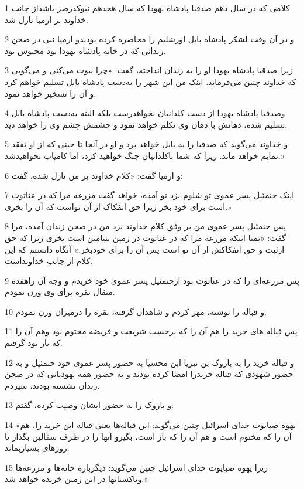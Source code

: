 \par 1 کلامی که در سال دهم صدقیا پادشاه یهودا که سال هجدهم نبوکدرصر باشداز جانب خداوند بر ارمیا نازل شد.
\par 2 و در آن وقت لشکر پادشاه بابل اورشلیم را محاصره کرده بودندو ارمیا نبی در صحن زندانی که در خانه پادشاه یهودا بود محبوس بود.
\par 3 زیرا صدقیا پادشاه یهودا او را به زندان انداخته، گفت: «چرا نبوت می‌کنی و می‌گویی که خداوند چنین می‌فرماید. اینک من این شهر را به‌دست پادشاه بابل تسلیم خواهم کرد و آن را تسخیر خواهد نمود.
\par 4 وصدقیا پادشاه یهودا از دست کلدانیان نخواهدرست بلکه البته به‌دست پادشاه بابل تسلیم شده، دهانش با دهان وی تکلم خواهد نمود و چشمش چشم وی را خواهد دید.
\par 5 و خداوند می‌گوید که صدقیا را به بابل خواهد برد و او در آنجا تا حینی که از او تفقد نمایم خواهد ماند. زیرا که شما باکلدانیان جنگ خواهید کرد، اما کامیاب نخواهیدشد.»
\par 6 و ارمیا گفت: «کلام خداوند بر من نازل شده، گفت:
\par 7 اینک حنمئیل پسر عموی تو شلوم نزد تو آمده، خواهد گفت مزرعه مرا که در عناتوت است برای خود بخر زیرا حق انفکاک از آن تواست که آن را بخری.»
\par 8 پس حنمئیل پسر عموی من بر وفق کلام خداوند نزد من در صحن زندان آمده، مرا گفت: «تمنا اینکه مزرعه مرا که در عناتوت در زمین بنیامین است بخری زیرا که حق ارثیت و حق انفکاکش از آن تو است پس آن را برای خودبخر.» آنگاه دانستم که این کلام از جانب خداونداست.
\par 9 پس مرزعه‌ای را که در عناتوت بود ازحنمئیل پسر عموی خود خریدم و وجه آن راهفده مثقال نقره برای وی وزن نمودم.
\par 10 و قباله را نوشته، مهر کردم و شاهدان گرفته، نقره را درمیزان وزن نمودم.
\par 11 پس قباله های خرید را هم آن را که برحسب شریعت و فریضه مختوم بود وهم آن را که باز بود گرفتم.
\par 12 و قباله خرید را به باروک بن نیریا ابن محسیا به حضور پسر عموی خود حنمئیل و به حضور شهودی که قباله خریدرا امضا کرده بودند و به حضور همه یهودیانی که در صحن زندان نشسته بودند، سپردم.
\par 13 و باروک را به حضور ایشان وصیت کرده، گفتم:
\par 14 «یهوه صبایوت خدای اسرائیل چنین می‌گوید: این قباله‌ها یعنی قباله این خرید را، هم آن را که مختوم است و هم آن را که باز است، بگیرو آنها را در ظرف سفالین بگذار تا روزهای بسیاربماند.
\par 15 زیرا یهوه صبایوت خدای اسرائیل چنین می‌گوید: دیگرباره خانه‌ها و مزرعه‌ها وتاکستانها در این زمین خریده خواهد شد.»
